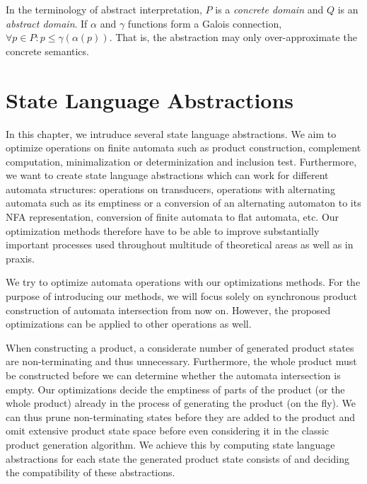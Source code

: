 In the terminology of abstract interpretation, $P$ is a \emph{concrete domain} and $Q$ is an \emph{abstract domain}. If $\alpha$ and $\gamma$ functions form a Galois connection, $\forall p \in P : p \leq \gamma(\alpha(p))$. That is, the abstraction may only over-approximate the concrete semantics.


\chapter{State Language Abstractions}

In this chapter, we intruduce several state language abstractions. We aim to optimize operations on finite automata such as product construction, complement computation, minimalization or determinization and inclusion test. Furthermore, we want to create state language abstractions which can work for different automata structures: operations on transducers, operations with alternating automata such as its emptiness or a conversion of an alternating automaton to its NFA representation, conversion of finite automata to flat automata, etc. Our optimization methods therefore have to be able to improve substantially important processes used throughout multitude of theoretical areas as well as in praxis.

We try to optimize automata operations with our optimizations methods. For the purpose of introducing our methods, we will focus solely on synchronous product construction of automata intersection from now on. However, the proposed optimizations can be applied to other operations as well.

When constructing a product, a considerate number of generated product states are non-terminating and thus unnecessary. Furthermore, the whole product must be constructed before we can determine whether the automata intersection is empty. Our optimizations decide the emptiness of parts of the product (or the whole product) already in the process of generating the product (on the fly). We can thus prune non-terminating states before they are added to the product and omit extensive product state space before even considering it in the classic product generation algorithm. We achieve this by computing state language abstractions for each state the generated product state consists of and deciding the compatibility of these abstractions.

